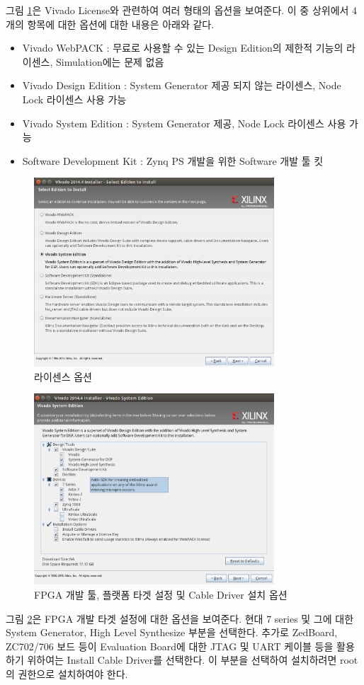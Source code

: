 \documentclass[11pt
  , a4paper
  , article
  , oneside
]{memoir}
\begin{document}
그림 \ref{fig:viva_install_3}은 Vivado License와 관련하여 여러 형태의 옵션을 보여준다. 이 중 상위에서 4개의 항목에 대한 옵션에 대한 내용은 아래와 같다.

\begin{itemize}
	\item Vivado WebPACK : 무료로 사용할 수 있는 Design Edition의 제한적 기능의 라이센스, Simulation에는 문제 없음
	\item Vivado Design Edition : System Generator 제공 되지 않는 라이센스, Node Lock 라이센스 사용 가능
	\item Vivado System Edition : System Generator 제공, Node Lock 라이센스 사용 가능
	\item Software Development Kit : Zynq PS 개발을 위한 Software 개발 툴 킷
\end{itemize}

\begin{figure}[h!]
	\centering
	\includegraphics[width=0.8\textwidth, height=0.4\textwidth]{./images/vivado-3.eps}
	\caption{라이센스 옵션}
	\label{fig:viva_install_3} 
\end{figure}	

\begin{figure}[h!]
	\centering
	\includegraphics[width=0.8\textwidth, height=0.4\textwidth]{./images/vivado-4.eps}
	\caption{FPGA 개발 툴, 플랫폼 타겟 설정 및 Cable Driver 설치 옵션}
	\label{fig:viva_install_4} 
\end{figure}	

그림 \ref{fig:viva_install_4}은 FPGA 개발 타겟 설정에 대한 옵션을 보여준다. 현대 7 series 및 그에 대한 System Generator, High Level Synthesize 부분을 선택한다. 추가로 ZedBoard, ZC702/706 보드 등이 Evaluation Board에 대한 JTAG 및 UART 케이블 등을 활용 하기 위하여는 Install Cable Driver를 선택한다. 이 부분을 선택하여 설치하려면 root의 권한으로 설치하여야 한다.
\end{document}
